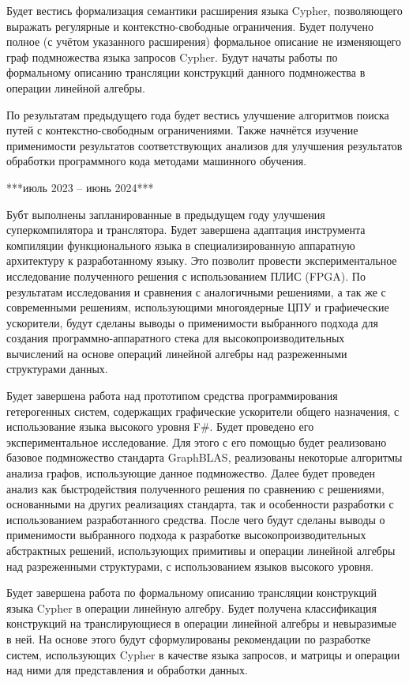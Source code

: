 \documentclass[12pt]{article}  %
\theoremstyle{remark}
\begin{document}
Будет вестись формализация семантики расширения языка Cypher, позволяющего выражать регулярные и контекстно-свободные ограничения. Будет получено полное (с учётом указанного расширения) формальное описание не изменяющего граф подмножества языка запросов Cypher. Будут начаты работы по формальному описанию трансляции конструкций данного подмножества в операции линейной алгебры.

По результатам предыдущего года будет вестись улучшение алгоритмов поиска путей с контекстно-свободным ограничениями. Также начнётся изучение применимости результатов соответствующих анализов для улучшения результатов обработки программного кода методами машинного обучения.

***июль 2023 -- июнь 2024***

Бубт выполнены запланированные в предыдущем году улучшения суперкомпилятора и транслятора. Будет завершена адаптация инструмента компиляции функционального языка в специализированную аппаратную архитектуру к разработанному языку. Это позволит провести экспериментальное исследование полученного решения с использованием ПЛИС (FPGA). По результатам исследования и сравнения с аналогичными решениями, а так же с современными решениям, использующими многоядерные ЦПУ и графиеческие ускорители, будут сделаны выводы о применимости выбранного подхода для создания программно-аппаратного стека для высокопроизводительных вычислений на основе операций линейной алгебры над разреженными структурами данных.

Будет завершена работа над прототипом средства программирования гетерогенных систем, содержащих графические ускорители общего назначения, с использование языка высокого уровня F\#. Будет проведено его экспериментальное исследование. Для этого с его помощью будет реализовано базовое подмножество стандарта GraphBLAS, реализованы некоторые алгоритмы анализа графов, использующие данное подмножество. Далее будет проведен анализ как быстродействия полученного решения по сравнению с решениями, основанными на других реализациях стандарта, так и особенности разработки с использованием разработанного средства. После чего будут сделаны выводы о применимости выбранного подхода к разработке высокопроизводительных абстрактных решений, использующих примитивы и операции линейной алгебры над разреженными структурами, с использованием языков высокого уровня.

Будет завершена работа по формальному описанию трансляции конструкций языка Cypher в операции линейную алгебру. Будет получена классификация конструкций на транслирующиеся в операции линейной алгебры и невыразимые в ней. На основе этого будут сформулированы рекомендации по разработке систем, использующих Cypher в качестве языка запросов, и матрицы и операции над ними для представления и обработки данных.
\end{document}
